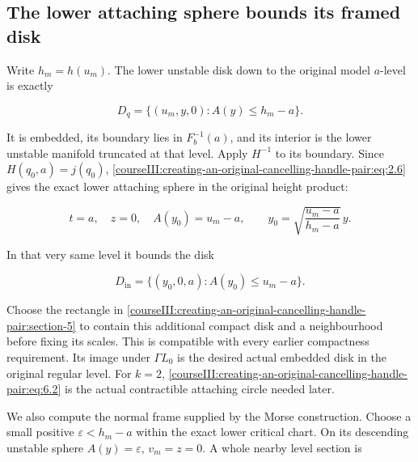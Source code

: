 \subsection{The lower attaching sphere bounds its framed disk}
\label{courseIII:creating-an-original-cancelling-handle-pair:pair-attaching-disk}

\label{courseIII:creating-an-original-cancelling-handle-pair:section-6}\label{courseIII:pair-creation:6}

Write \(h_m=h(u_m)\). The lower unstable disk down to the original model \(a\)-level is exactly

\begin{equation}
D_q=\{(u_m,y,0):A(y)\leq h_m-a\}.
 \label{courseIII:creating-an-original-cancelling-handle-pair:eq:6.1}
\end{equation}

It is embedded, its boundary lies in \(F_b^{-1}(a)\), and its interior is the lower unstable manifold truncated at that level. Apply \(H^{-1}\) to its boundary. Since \(H(q_0,a)=j(q_0)\), \eqref{courseIII:creating-an-original-cancelling-handle-pair:eq:2.6} gives the exact lower attaching sphere in the original height product:

\begin{equation}
t=a,\quad z=0,\quad A(y_0)=u_m-a,\qquad
 y_0=\sqrt{\frac{u_m-a}{h_m-a}}\,y.
 \label{courseIII:creating-an-original-cancelling-handle-pair:eq:6.2}
\end{equation}

In that very same level it bounds the disk

\begin{equation}
D_{\mathrm{in}}=\{(y_0,0,a):A(y_0)\leq u_m-a\}.
 \label{courseIII:creating-an-original-cancelling-handle-pair:eq:6.3}
\end{equation}

Choose the rectangle in \cref{courseIII:creating-an-original-cancelling-handle-pair:section-5} to contain this additional compact disk and a neighbourhood before fixing its scales. This is compatible with every earlier compactness requirement. Its image under \(\Gamma L_0\) is the desired actual embedded disk in the original regular level. For \(k=2\), \eqref{courseIII:creating-an-original-cancelling-handle-pair:eq:6.2} is the actual contractible attaching circle needed later.

We also compute the normal frame supplied by the Morse construction. Choose a small positive \(\varepsilon<h_m-a\) within the exact lower critical chart. On its descending unstable sphere \(A(y)=\varepsilon\), \(v_m=z=0\). A whole nearby level section is


